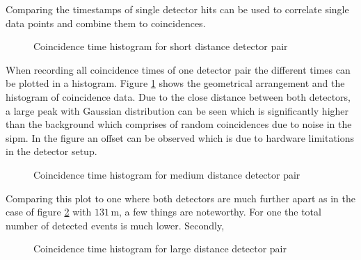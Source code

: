 \documentclass[abstract,toc,los,lof,english,10pt,glossary,acronyms,lotl]{jluthesis}
\begin{document}
Comparing the timestamps of single detector hits can be used to correlate single data points and combine them to coincidences.
\begin{figure}[H]
	\centering
	\caption{Coincidence time histogram for short distance detector pair}
	\label{fig:histogram-data}
\end{figure}
When recording all coincidence times of one detector pair the different times can be plotted in a histogram. Figure \ref{fig:histogram-data} shows the geometrical arrangement and the histogram of coincidence data. Due to the close distance between both detectors, a large peak with Gaussian distribution can be seen which is significantly higher than the background which comprises of random coincidences due to noise in the \acrshort{sipm}. In the figure an offset can be observed which is due to hardware limitations in the detector setup.
\begin{figure}[H]
	\centering
	\caption{Coincidence time histogram for medium distance detector pair}
	\label{fig:histogram-data-130}
\end{figure}
Comparing this plot to one where both detectors are much further apart as in the case of figure \ref{fig:histogram-data-130} with $131\,\text{m}$, a few things are noteworthy.
For one the total number of detected events is much lower. 
Secondly, 
\begin{figure}[H]
	\centering
	\caption{Coincidence time histogram for large distance detector pair}
	\label{fig:histogram-data-950k}
\end{figure}
\end{document}
